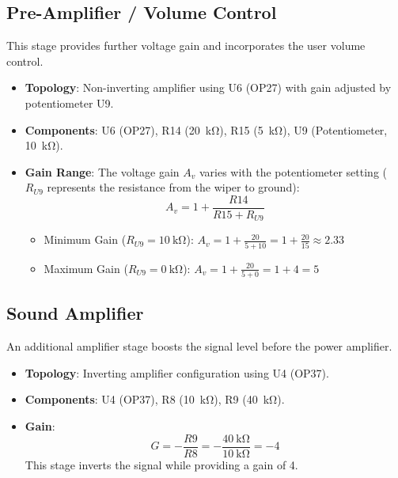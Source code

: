 \documentclass[conference]{IEEEtran}
\begin{document}
\subsection{Pre-Amplifier / Volume Control}
This stage provides further voltage gain and incorporates the user volume control.
\begin{itemize}
    \item \textbf{Topology}: Non-inverting amplifier using U6 (OP27) with gain adjusted by potentiometer U9.
    \item \textbf{Components}: U6 (OP27), R14 (\SI{20}{\kilo\ohm}), R15 (\SI{5}{\kilo\ohm}), U9 (Potentiometer, \SI{10}{\kilo\ohm}).
    \item \textbf{Gain Range}: The voltage gain $A_v$ varies with the potentiometer setting ($R_{U9}$ represents the resistance from the wiper to ground):
        \begin{equation}
            A_v = 1 + \frac{R14}{R15 + R_{U9}}
        \end{equation}
        \begin{itemize}
            \item Minimum Gain ($R_{U9}=\SI{10}{\kilo\ohm}$): $A_v = 1 + \frac{20}{5 + 10} = 1 + \frac{20}{15} \approx 2.33$
            \item Maximum Gain ($R_{U9}=\SI{0}{\kilo\ohm}$): $A_v = 1 + \frac{20}{5 + 0} = 1 + 4 = 5$
        \end{itemize}
\end{itemize}

\subsection{Sound Amplifier}
An additional amplifier stage boosts the signal level before the power amplifier.
\begin{itemize}
    \item \textbf{Topology}: Inverting amplifier configuration using U4 (OP37).
    \item \textbf{Components}: U4 (OP37), R8 (\SI{10}{\kilo\ohm}), R9 (\SI{40}{\kilo\ohm}).
    \item \textbf{Gain}:
        \begin{equation}
            G = -\frac{R9}{R8} = -\frac{\SI{40}{\kilo\ohm}}{\SI{10}{\kilo\ohm}} = -4
        \end{equation}
        This stage inverts the signal while providing a gain of 4.
\end{itemize}
\end{document}
